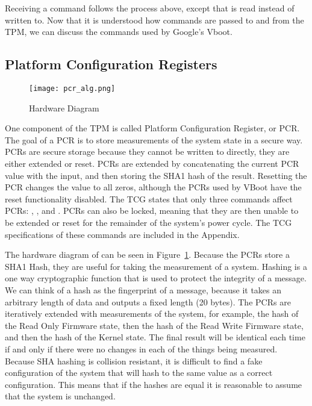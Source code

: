 Receiving a command follows the process above, except that  is read instead of written to.
Now that it is understood how commands are passed to and from the TPM, we can discuss the commands used by Google's Vboot.

\subsection{Platform Configuration Registers}

\begin{figure}
  \centering
  \texttt{[image: pcr\_alg.png]}
  \caption{ Hardware Diagram}
  \label{fig:pcr_alg}
\end{figure}

One component of the TPM is called Platform Configuration Register, or PCR.
The goal of a PCR is to store measurements of the system state in a secure way. 
PCRs are secure storage because they cannot be written to directly, they are either extended or reset. 
PCRs are extended by concatenating the current PCR value with the input, and then storing the SHA1 hash of the result. 
Resetting the PCR changes the value to all zeros, although the PCRs used by VBoot have the reset functionality disabled.
The TCG states that only three commands affect PCRs: ,
, and .
PCRs can also be locked, meaning that they are then unable to be extended or reset for the remainder of the system's power cycle.
The TCG specifications of these commands are included in the Appendix.


The hardware diagram of  can be seen in Figure~\ref{fig:pcr_alg}.
Because the PCRs store a SHA1 Hash, they are useful for taking the measurement of a system.  
Hashing is a one way cryptographic function that is used to protect the integrity of a message.
We can think of a hash as the fingerprint of a message, because it takes an arbitrary length of data and outputs a fixed length (20 bytes).
The PCRs are iteratively extended with measurements of the system, for example,
the hash of the Read Only Firmware state, then the hash of the Read Write
Firmware state, and then the hash of the Kernel state.
The final result will be identical each time if and only if there were no changes in each of the things being measured.
Because SHA hashing is collision resistant, it is difficult to find a fake
configuration of the system that will hash to the same value as a correct
configuration.
This means that if the hashes are equal it is reasonable to assume that the system is unchanged. 


